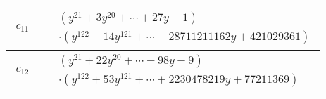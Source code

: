 \documentclass[1p]{elsarticle_modified}
\theoremstyle{definition}
\begin{document}
\begin{tabular}{m{50pt}|m{274pt}}
\hline $$\begin{aligned}c_{11}\end{aligned}$$&$\begin{aligned}
&(y^{21}+3 y^{20}+\cdots+27 y-1)\\
&\cdot(y^{122}-14 y^{121}+\cdots-28711211162 y+421029361)
\end{aligned}$\\
\hline $$\begin{aligned}c_{12}\end{aligned}$$&$\begin{aligned}
&(y^{21}+22 y^{20}+\cdots-98 y-9)\\
&\cdot(y^{122}+53 y^{121}+\cdots+2230478219 y+77211369)
\end{aligned}$\\
\hline
\end{tabular}
\vskip 2pc
\end{document}
